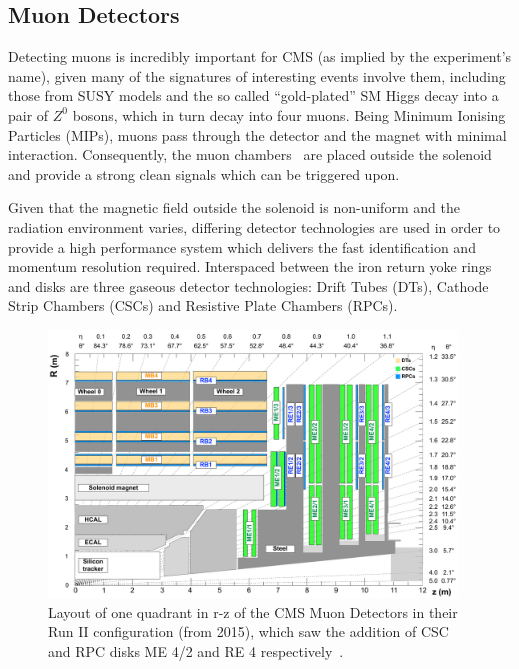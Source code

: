 \subsection{Muon Detectors}\label{subsec:muon chambers}
Detecting muons is incredibly important for CMS (as implied by the experiment’s name), given many of the signatures of interesting events involve them, including those from SUSY models and the so called “gold-plated” SM Higgs decay into a pair of $Z^{0}$ bosons, which in turn decay into four muons. 
Being Minimum Ionising Particles (MIPs), muons pass through the detector and the magnet with minimal interaction.
Consequently, the muon chambers~\cite{CMS:1997iti} are placed outside the solenoid and provide a strong clean signals which can be triggered upon.

Given that the magnetic field outside the solenoid is non-uniform and the radiation environment varies, differing detector technologies are used in order to provide a high performance system which delivers the fast identification and momentum resolution required. 
Interspaced between the iron return yoke rings and disks are three gaseous detector technologies: Drift Tubes (DTs), Cathode Strip Chambers (CSCs) and Resistive Plate Chambers (RPCs).

\begin{figure}[htbp]
\begin{center}
\includegraphics[width=0.97\textwidth]{figs/cms/cms_muon_quadrant_run_ii.pdf}
\caption{Layout of one quadrant in r-z of the CMS Muon Detectors in their Run II configuration (from 2015), which saw the addition of CSC and RPC disks ME 4/2 and RE 4 respectively~\cite{CMS-DP-2016-046}.}
\label{fig:muonChambers}
\end{center}
\end{figure}

